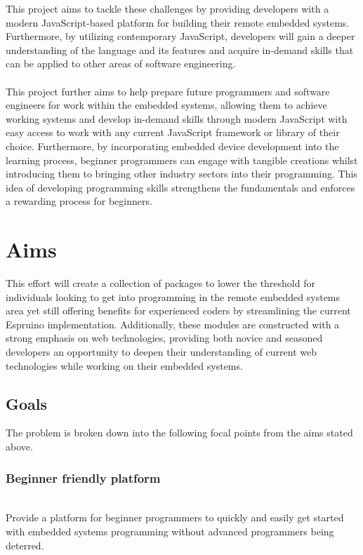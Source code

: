 \documentclass{l4proj}
\begin{document}
This project aims to tackle these challenges by providing developers with a modern JavaScript-based platform for building their remote embedded systems. Furthermore, by utilizing contemporary JavaScript, developers will gain a deeper understanding of the language and its features and acquire in-demand skills that can be applied to other areas of software engineering.
\\ \\
This project further aims to help prepare future programmers and software engineers for work within the embedded systems, allowing them to achieve working systems and develop in-demand skills through modern JavaScript with easy access to work with any current JavaScript framework or library of their choice. Furthermore, by incorporating embedded device development into the learning process, beginner programmers can engage with tangible creations whilst introducing them to bringing other industry sectors into their programming. This idea of developing programming skills strengthens the fundamentals and enforces a rewarding process for beginners.

\section{Aims} %

\text This effort will create a collection of packages to lower the threshold for individuals looking to get into programming in the remote embedded systems area yet still offering benefits for experienced coders by streamlining the current Espruino implementation. Additionally, these modules are constructed with a strong emphasis on web technologies, providing both novice and seasoned developers an opportunity to deepen their understanding of current web technologies while working on their embedded systems.
\subsection{Goals} %
\text The problem is broken down into the following focal points from the aims stated above.
\\
\subsubsection{Beginner friendly platform} \hfill\\
\text Provide a platform for beginner programmers to quickly and easily get started with embedded systems programming without advanced programmers being deterred.
\\
\end{document}
